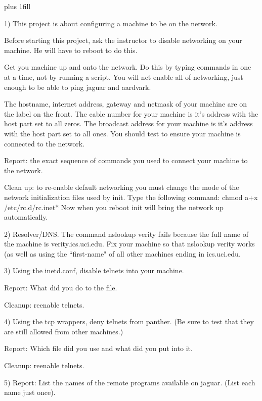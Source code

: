 
\rightskip=0pt plus 1fill

\parindent 0pt

1) This project is about configuring a machine to be on the network.

Before starting this project, ask the instructor to disable networking
on your machine. He will have to reboot to do this.

Get you machine up and onto the network.
Do this by typing commands in one at a time, not by running a script.
You will net enable all of networking, just enough to be
able to ping {\ltt{}jaguar} and {\ltt{}aardvark}.

The hostname, internet address, gateway and netmask of your machine are
on the label on the front.
The cable number for your machine is it's address with the host
part set to all zeros.
The broadcast address for your machine is it's address with the host
part set to all ones.
You should test to ensure your machine is connected to the network.

Report: the exact sequence of commands you used to connect your machine
to the network.

Clean up: to re-enable default networking you must change the mode
of the network initialization files used by {\ltt{}init}.
Type the following command:
\hfill\break
{\ltt{}chmod a+x /etc/rc.d/rc.inet*}
\hfill\break
Now when you reboot {\ltt{}init} will bring the network up automatically.

2) Resolver/DNS. The command {\ltt{}nslookup verity} fails because the full name
of the machine is {\ltt{}verity.ics.uci.edu}.
Fix your machine so that {\ltt{}nslookup verity} works (as well as using
the ``first-name" of all other machines ending in {\ltt{}ics.uci.edu}.

3) Using the {\ltt{}inetd.conf}, disable telnets into your machine.

Report: What did you do to the file.

Cleanup: reenable telnets.

4) Using the tcp wrappers, deny telnets from {\ltt{}panther}. (Be sure to test
that they are still allowed from other machines.)

Report: Which file did you use and what did you put into it.

Cleanup: reenable telnets.

5) Report: List the names of the remote programs available on {\ltt{}jaguar}.
(List each name just once).

